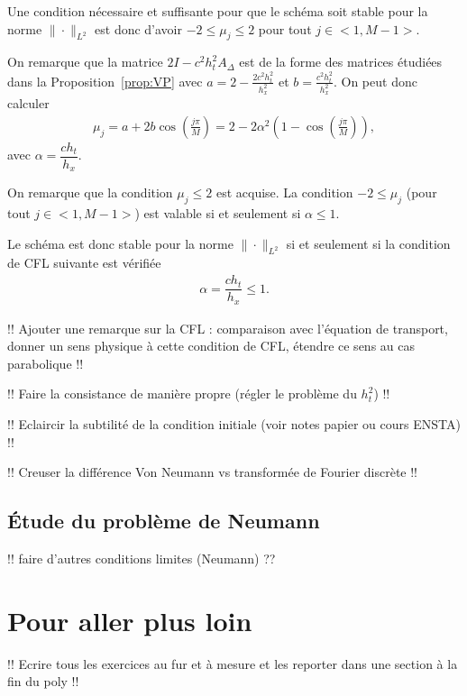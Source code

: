 \documentclass[12pt,a4paper,twoside]{article}
\begin{document}
Une condition n\'ecessaire et suffisante pour que le sch\'ema soit stable
pour la norme $\| \cdot \|_{L^2}$ est donc d'avoir
$-2 \leq \mu_j \leq 2$ pour tout $j \in <1,M-1>$.

On remarque que la matrice $2I - c^2 h_t^2 A_{\Delta}$ est de la forme des matrices \'etudi\'ees
dans la Proposition~\ref{prop:VP} avec $a = 2 - \frac{2 c^2 h_t^2}{h_x^2}$
et $b=\frac{c^2 h_t^2}{h_x^2}$.
On peut donc calculer
\begin{align*}
  \mu_j = a + 2b \cos\left(\frac{j \pi}{M}\right)
  = 2 - 2 \alpha^2 \left(1 - \cos\left(\frac{j\pi}{M}\right)\right) ,
\end{align*}
avec $\alpha = \dfrac{c h_t}{h_x}$.

On remarque que la condition $\mu_j \leq 2$ est acquise.
La condition $-2 \leq \mu_j$ (pour tout $j \in <1,M-1>$)
est valable si et seulement si $\alpha \leq 1$.

Le sch\'ema est donc stable pour la norme $\| \cdot \|_{L^2}$ si et seulement si
la condition de CFL suivante est v\'erifi\'ee
\begin{align*}
  \alpha = \dfrac{c h_t}{h_x} \leq 1 .
\end{align*}


!! Ajouter une remarque sur la CFL : comparaison avec l'\'equation de transport,
donner un sens physique \`a cette condition de CFL, \'etendre ce sens au cas parabolique !!

!! Faire la consistance de mani\`ere propre (r\'egler le probl\`eme du $h_t^2$) !!

!! Eclaircir la subtilit\'e de la condition initiale (voir notes papier ou cours ENSTA) !!

!! Creuser la diff\'erence Von Neumann vs transform\'ee de Fourier discr\`ete !!

\subsection{\'Etude du probl\`eme de Neumann}


!! faire d'autres conditions limites (Neumann) ??

\section{Pour aller plus loin}

!! Ecrire tous les exercices au fur et \`a mesure et les reporter
dans une section \`a la fin du poly !!
\end{document}
